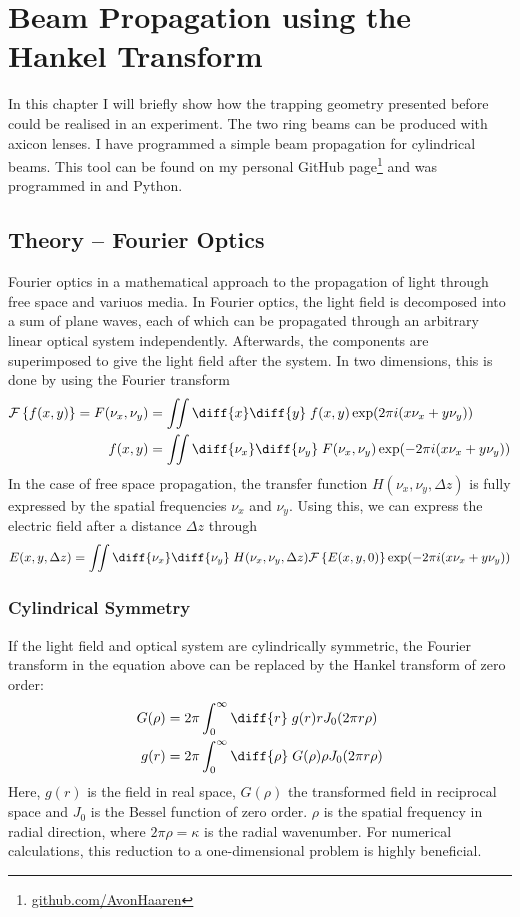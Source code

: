 

\chapter{Beam Propagation using the Hankel Transform}
\label{cha:beam_propagation}

In this chapter I will briefly show how the trapping geometry presented before could be realised in an experiment.
The two ring beams can be produced with axicon lenses. I have programmed a simple beam propagation for cylindrical beams. This tool can be found on my personal GitHub page\footnote{\url{github.com/AvonHaaren}} and was programmed in \Cpp and Python.

\section{Theory -- Fourier Optics}
Fourier optics in a mathematical approach to the propagation of light through free space and variuos media. In Fourier optics, the light field is decomposed into a sum of plane waves, each of which can be propagated through an arbitrary linear optical system independently. Afterwards, the components are superimposed to give the light field after the system. In two dimensions, this is done by using the Fourier transform
\begin{align}
    \mathcal{F}\left\{f(x,y)\right\} = F(\nu_x,\nu_y) &= \iint \diff{x} \diff{y}\; f(x,y) \exp\!\left(2\pi i (x\nu_x + y\nu_y)\right) \\
    f(x,y) &= \iint \diff{\nu_x} \diff{\nu_y}\; F(\nu_x,\nu_y) \exp\!\left(-2\pi i (x\nu_x + y\nu_y)\right)
\end{align}
In the case of free space propagation, the transfer function $H(\nu_x,\nu_y,\Delta z)$ is fully expressed by the spatial frequencies $\nu_x$ and $\nu_y$. Using this, we can express the electric field after a distance $\Delta z$ through
\begin{align}
    E(x,y,\Delta z) = \iint \diff{\nu_x} \diff{\nu_y}\; H(\nu_x,\nu_y,\Delta z) \mathcal{F}\left\{E(x,y,0)\right\} \exp\!\left(-2\pi i (x\nu_x + y\nu_y)\right)
\end{align}

\subsection{Cylindrical Symmetry}
If the light field and optical system are cylindrically symmetric, the Fourier transform in the equation above can be replaced by the Hankel transform of zero order:
\begin{align}
    G(\rho) &= 2\pi\int_0^\infty \diff{r}\; g(r) r J_0(2\pi r \rho) \\
    g(r) &= 2\pi \int_0^\infty \diff{\rho}\; G(\rho) \rho J_0(2\pi r \rho)
\end{align}
Here, $g(r)$ is the field in real space, $G(\rho)$ the transformed field in reciprocal space and $J_0$ is the Bessel function of zero order. $\rho$ is the spatial frequency in radial direction, where $2\pi\rho = \kappa$ is the radial wavenumber. For numerical calculations, this reduction to a one-dimensional problem is highly beneficial.


